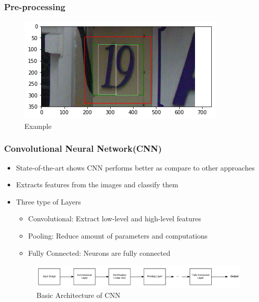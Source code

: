 \documentclass[11.5pt,aspectratio=1610,xcolor={usenames,dvipsnames,table}]{beamer}
\begin{document}
\begin{frame}

\frametitle{Pre-processing}

\begin{figure}[!h]
\includegraphics[width=\textwidth]{19.png}
\caption{Example }

\end{figure}
\end{frame}

\begin{frame}

\frametitle{Convolutional Neural Network(CNN)}

\begin{itemize}
	\item State-of-the-art shows CNN performs better as compare to other approaches\cite{cnn}
	\item Extracts features from the images and classify them
	\item Three type of Layers
		\begin{itemize}
			\item Convolutional: Extract low-level and high-level features
			\item Pooling: Reduce amount of parameters and computations
			\item Fully Connected: Neurons are fully connected
		\end{itemize}	
	\begin{figure}[!h]
		\includegraphics[width=\textwidth]{cnn.png}
		\caption{Basic Architecture of CNN }
		
	\end{figure}

\end{itemize}
\end{frame}
\end{document}
